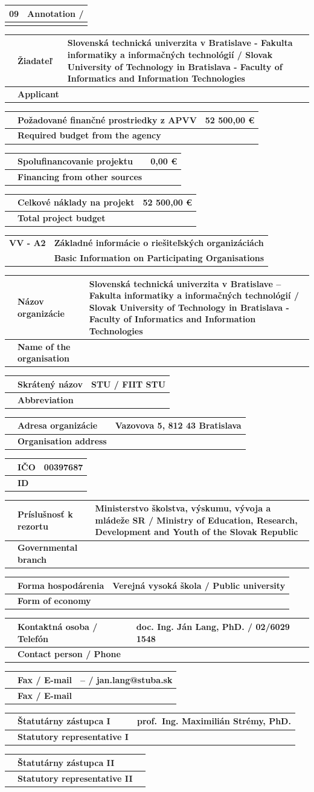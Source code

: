 \documentclass[9pt,a4paper]{extarticle}
\newcommand{\SecHead}[3]{\par\needspace{45pt}\vspace{7pt}\noindent
\begin{tabularx}{\textwidth}{|>{\bfseries\centering\arraybackslash}p{18mm}|X|}
\hline\cellcolor{shade}#1 & \cellcolor{shade}\hfill\bfseries #2 \\ \cellcolor{shade} & \cellcolor{shade}\hfill\bfseries #3 \\ \hline
\end{tabularx}\vspace{3pt}\par}
\newcommand{\Field}[4]{\noindent\begin{tabularx}{\textwidth}{|>{\centering\arraybackslash}p{7mm}|>{\columncolor{shade}}p{59mm}|X|}\hline
\multirowdummy{#1} & \textbf{#2} & \multirowdummy{#4} \\ \cline{2-2}
& \textbf{#3} & \\ \hline\end{tabularx}\par\vspace{-1pt}}
\newcommand{\multirowdummy}[1]{#1}
\newcommand{\WideField}[4]{\noindent\begin{tabularx}{\textwidth}{|>{\columncolor{shade}}p{7mm}|>{\columncolor{shade}}X|}\hline
#1 & \textbf{#2} / #3 \\ \hline\multicolumn{2}{|p{\dimexpr\textwidth-2\tabcolsep-2\arrayrulewidth\relax}|}{#4}\\\hline\end{tabularx}\par\vspace{-1pt}}
\begin{document}
\WideField{09}{Annotation}{}{The SOUND-EDGE project focuses on developing an innovative predictive maintenance system for rotating machinery, such as motors and bearings, within Industry 4.0. Traditional solutions transmit large volumes of raw vibration and acoustic data to the cloud, causing high latency, excessive bandwidth consumption, and security risks. Commercial systems are also often too expensive for small and medium-sized enterprises (SMEs).

The project addresses these challenges using TinyML (Edge AI) technology. Its main objective is to design a software architecture and optimized deep neural network models capable of analyzing acoustic and vibration signals directly on low-cost, energy-efficient IoT devices. Edge processing reduces wireless data transmission, energy consumption, latency, and security risks. Cloud services will be used only to aggregate anomaly statistics, minimizing transmitted data.

The main outputs of the project will be a software architecture design and a model of a TinyML algorithm, which will be validated through simulation and evaluated on available industrial benchmark datasets. The NASA IMS bearing dataset, containing continuous vibration recordings preceding bearing failure, will serve as the primary validation source.
The research aims to transform a theoretical concept into a software-validated solution capable of detecting early-stage machinery faults. The results will provide SMEs with a foundation for reducing maintenance costs, preventing unexpected failures, and extending equipment lifespan.}
\Field{10}{Žiadateľ}{Applicant}{Slovenská technická univerzita v Bratislave - Fakulta informatiky a informačných technológií / Slovak University of Technology in Bratislava - Faculty of Informatics and Information Technologies}
\Field{11}{Požadované finančné prostriedky z APVV}{Required budget from the agency}{52 500,00 €}
\Field{12}{Spolufinancovanie projektu}{Financing from other sources}{0,00 €}
\Field{13}{Celkové náklady na projekt}{Total project budget}{52 500,00 €}
\clearpage

\SecHead{VV - A2}{Základné informácie o riešiteľských organizáciách}{Basic Information on Participating Organisations}
\Field{01}{Názov organizácie}{Name of the organisation}{Slovenská technická univerzita v Bratislave – Fakulta informatiky a informačných technológií / Slovak University of Technology in Bratislava - Faculty of Informatics and Information Technologies}
\Field{02}{Skrátený názov}{Abbreviation}{STU / FIIT STU}
\Field{03}{Adresa organizácie}{Organisation address}{Vazovova 5, 812 43 Bratislava}
\Field{04}{IČO}{ID}{00397687}
\Field{05}{Príslušnosť k rezortu}{Governmental branch}{Ministerstvo školstva, výskumu, vývoja a mládeže SR / Ministry of Education, Research, Development and Youth of the Slovak Republic}
\Field{06}{Forma hospodárenia}{Form of economy}{Verejná vysoká škola / Public university}
\Field{07}{Kontaktná osoba / Telefón}{Contact person / Phone}{doc. Ing. Ján Lang, PhD. / 02/6029 1548}
\Field{07}{Fax / E-mail}{Fax / E-mail}{-- / jan.lang@stuba.sk}
\Field{08}{Štatutárny zástupca I}{Statutory representative I}{prof.~Ing. Maximilián Strémy, PhD.}
\Field{09}{Štatutárny zástupca II}{Statutory representative II}{}
\clearpage
\end{document}
